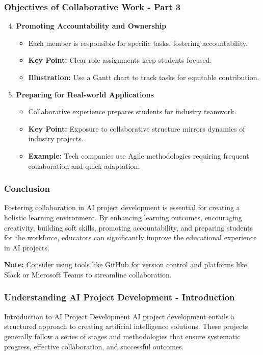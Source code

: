 \documentclass{beamer}
\begin{document}
\begin{frame}[fragile]
    \frametitle{Objectives of Collaborative Work - Part 3}
    \begin{enumerate}
        \setcounter{enumi}{3} %
        \item \textbf{Promoting Accountability and Ownership}
            \begin{itemize}
                \item Each member is responsible for specific tasks, fostering accountability.
                \item \textbf{Key Point:} Clear role assignments keep students focused.
                \item \textbf{Illustration:} Use a Gantt chart to track tasks for equitable contribution.
            \end{itemize}

        \item \textbf{Preparing for Real-world Applications}
            \begin{itemize}
                \item Collaborative experience prepares students for industry teamwork.
                \item \textbf{Key Point:} Exposure to collaborative structure mirrors dynamics of industry projects.
                \item \textbf{Example:} Tech companies use Agile methodologies requiring frequent collaboration and quick adaptation.
            \end{itemize}
    \end{enumerate}
\end{frame}

\begin{frame}[fragile]
    \frametitle{Conclusion}
    Fostering collaboration in AI project development is essential for creating a holistic learning environment. By enhancing learning outcomes, encouraging creativity, building soft skills, promoting accountability, and preparing students for the workforce, educators can significantly improve the educational experience in AI projects.

    \textbf{Note:} Consider using tools like GitHub for version control and platforms like Slack or Microsoft Teams to streamline collaboration.
\end{frame}

\begin{frame}[fragile]
    \frametitle{Understanding AI Project Development - Introduction}
    \begin{block}{Introduction to AI Project Development}
        AI project development entails a structured approach to creating artificial intelligence solutions. These projects generally follow a series of stages and methodologies that ensure systematic progress, effective collaboration, and successful outcomes.
    \end{block}
\end{frame}
\end{document}
